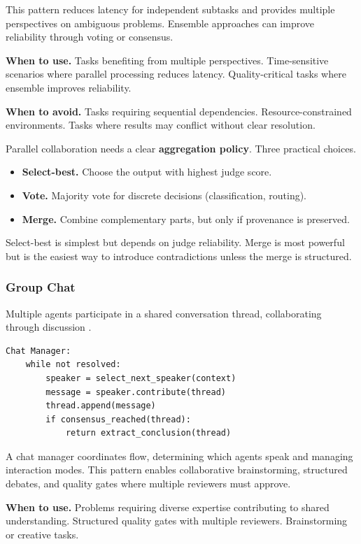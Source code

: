 This pattern reduces latency for independent subtasks and provides multiple perspectives on ambiguous problems. Ensemble approaches can improve reliability through voting or consensus.

\textbf{When to use.} Tasks benefiting from multiple perspectives. Time-sensitive scenarios where parallel processing reduces latency. Quality-critical tasks where ensemble improves reliability.

\textbf{When to avoid.} Tasks requiring sequential dependencies. Resource-constrained environments. Tasks where results may conflict without clear resolution.

Parallel collaboration needs a clear \textbf{aggregation policy}. Three practical choices.
\begin{itemize}
\item \textbf{Select-best.} Choose the output with highest judge score.
\item \textbf{Vote.} Majority vote for discrete decisions (classification, routing).
\item \textbf{Merge.} Combine complementary parts, but only if provenance is preserved.
\end{itemize}
Select-best is simplest but depends on judge reliability. Merge is most powerful but is the easiest way to introduce contradictions unless the merge is structured.

\subsubsection{Group Chat}

Multiple agents participate in a shared conversation thread, collaborating through discussion \cite{msagentpatterns2025}.

\begin{verbatim}
Chat Manager:
    while not resolved:
        speaker = select_next_speaker(context)
        message = speaker.contribute(thread)
        thread.append(message)
        if consensus_reached(thread):
            return extract_conclusion(thread)
\end{verbatim}

A chat manager coordinates flow, determining which agents speak and managing interaction modes. This pattern enables collaborative brainstorming, structured debates, and quality gates where multiple reviewers must approve.

\textbf{When to use.} Problems requiring diverse expertise contributing to shared understanding. Structured quality gates with multiple reviewers. Brainstorming or creative tasks.

